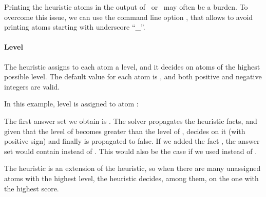 \begin{note}
Printing the heuristic atoms in the output of \clingo\ or \clasp\ may often be a burden.
To overcome this issue,
we can use the command line option ,
that allows to avoid printing atoms starting with underscore ``\_''.
\end{note}

\paragraph{Level}
The  heuristic assigns to each atom a level, and it decides on atoms of the highest possible level.
The default value for each atom is ,  and both positive and negative integers are valid.
\begin{example} 
\label{example:level}
In this example,  
level  is assigned to atom :

The first answer set we obtain is 
.
The solver propagates the heuristic facts, and given that the level of  becomes greater than the level of ,
decides on it (with positive sign) and finally  is propagated to false.
If we added the fact ,  the answer set would contain  instead of .
This would also be the case if we used  instead of .
\eexample
\end{example}

\begin{note}
The  heuristic is an extension of the  heuristic, 
so when there are many unassigned atoms with the highest level,
the heuristic decides, among them, on the one with the highest  score.
\end{note}

